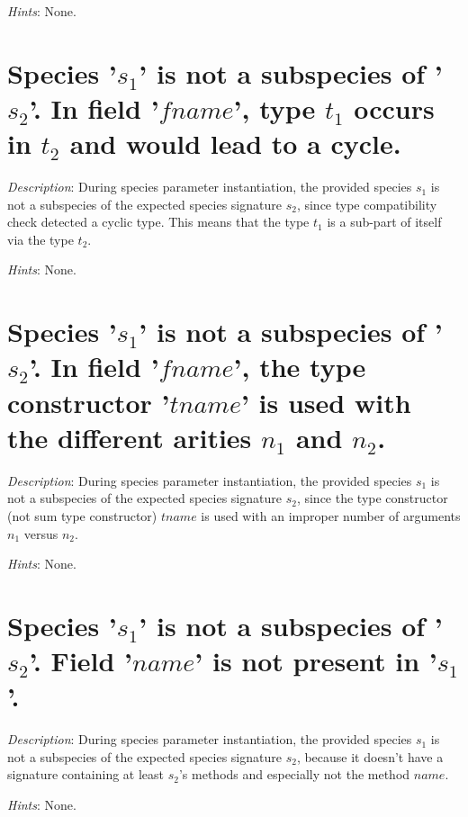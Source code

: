 {\em Hints}: None.



\section*{Species '$s_1$' is not a subspecies of '$s_2$'. In field
  '$fname$', type $t_1$ occurs in $t_2$ and would lead to a cycle.}

{\em Description}: During species parameter instantiation, the
provided species $s_1$ is not a subspecies of the expected species
signature $s_2$, since type compatibility check detected a cyclic
type. This means that the type $t_1$ is a sub-part of itself via the
type $t_2$.

{\em Hints}: None.



\section*{Species '$s_1$' is not a subspecies of '$s_2$'. In field
  '$fname$', the type constructor '$tname$' is used with the different
  arities $n_1$ and $n_2$.}

{\em Description}: During species parameter instantiation, the
provided species $s_1$ is not a subspecies of the expected species
signature $s_2$, since the type constructor (not sum type constructor)
$tname$ is used with an improper number of arguments $n_1$ versus
$n_2$.

{\em Hints}: None.



\section*{Species '$s_1$' is not a subspecies of '$s_2$'. Field '$name$'
  is not present in '$s_1$'.}

{\em Description}: During species parameter instantiation, the
provided species $s_1$ is not a subspecies of the expected species
signature $s_2$, because it doesn't have a signature containing at
least $s_2$'s methods and especially not the method $name$.

{\em Hints}: None.




